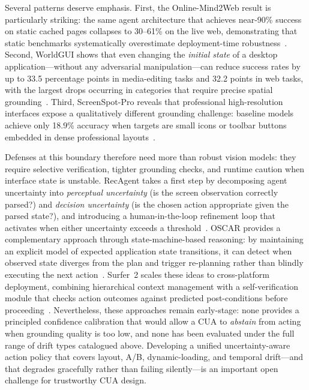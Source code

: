Several patterns deserve emphasis. First, the Online-Mind2Web result is particularly striking: the same agent architecture that achieves near-90\% success on static cached pages collapses to 30--61\% on the live web, demonstrating that static benchmarks systematically overestimate deployment-time robustness~\cite{onlinemind2web2025}. Second, WorldGUI shows that even changing the \emph{initial state} of a desktop application---without any adversarial manipulation---can reduce success rates by up to 33.5 percentage points in media-editing tasks and 32.2 points in web tasks, with the largest drops occurring in categories that require precise spatial grounding~\cite{worldgui2025}. Third, ScreenSpot-Pro reveals that professional high-resolution interfaces expose a qualitatively different grounding challenge: baseline models achieve only 18.9\% accuracy when targets are small icons or toolbar buttons embedded in dense professional layouts~\cite{screenspotpro2025}.

Defenses at this boundary therefore need more than robust vision models: they require selective verification, tighter grounding checks, and runtime caution when interface state is unstable. RecAgent takes a first step by decomposing agent uncertainty into \emph{perceptual uncertainty} (is the screen observation correctly parsed?) and \emph{decision uncertainty} (is the chosen action appropriate given the parsed state?), and introducing a human-in-the-loop refinement loop that activates when either uncertainty exceeds a threshold~\cite{recagent2025}. OSCAR provides a complementary approach through state-machine-based reasoning: by maintaining an explicit model of expected application state transitions, it can detect when observed state diverges from the plan and trigger re-planning rather than blindly executing the next action~\cite{oscar2025}. Surfer~2 scales these ideas to cross-platform deployment, combining hierarchical context management with a self-verification module that checks action outcomes against predicted post-conditions before proceeding~\cite{surfer22025}. Nevertheless, these approaches remain early-stage: none provides a principled confidence calibration that would allow a CUA to \emph{abstain} from acting when grounding quality is too low, and none has been evaluated under the full range of drift types catalogued above. Developing a unified uncertainty-aware action policy that covers layout, A/B, dynamic-loading, and temporal drift---and that degrades gracefully rather than failing silently---is an important open challenge for trustworthy CUA design.

